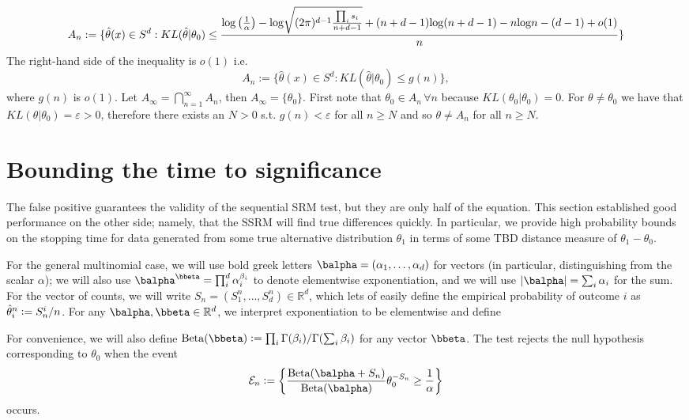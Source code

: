 \documentclass[11pt]{article}
\def\log{{\rm log}}
\newcommand{\Reals}{\mathbb R}
\newcommand{\Beta}{\mathrm{Beta}}
\newcommand{\df}{\vcentcolon=}
\begin{document}
\begin{equation}
  A_n := \lbrace \hat{\theta}(x) \in  S^d : KL(\hat{\theta}|\theta_0)  \leq \frac{\log\left(\frac{1}{\alpha}\right) - \log\sqrt{(2\pi)^{d-1}\frac{ \prod_i s_i}{n+d-1}}+ (n+d-1) \log (n+d-1) -  n \log n -(d-1)+o(1) }{n} \rbrace
\end{equation}
The right-hand side of the inequality is $o(1)$ i.e.
\begin{equation}
  A_n := \lbrace \hat{\theta}(x) \in  S^d : KL(\hat{\theta}|\theta_0)  \leq g(n) \rbrace,
\end{equation}
where $g(n)$ is $o(1)$.
Let $A_{\infty} = \bigcap_{n=1}^{\infty} A_n$, then $A_{\infty} = \lbrace \theta_0 \rbrace$. First note that $\theta_0 \in A_n \, \forall n$ because $KL(\theta_0|\theta_0) = 0$. For $\theta \neq \theta_0$ we have that $KL(\theta|\theta_0) = \varepsilon >  0$, therefore there exists an $N>0$ s.t. $g(n) < \varepsilon$ for all $n \geq N$ and so $\theta \neq A_n$ for all $n \geq N$.



\section{Bounding the time to significance}
The false positive guarantees the validity of the sequential SRM test, but they are only half of the equation. This section established good performance on the other side; namely, that the SSRM will find true differences quickly. In particular, we provide high probability bounds on the stopping time for data generated from some true alternative distribution $\theta_1$ in terms of some TBD distance measure of $\theta_1 - \theta_0$.

For the general multinomial case, we will use bold greek letters $\balpha = (\alpha_1,\ldots, \alpha_d)$ for vectors (in particular, distinguishing from the scalar $\alpha$); we will also use $\balpha^\bbeta = \prod_{i}^d \alpha_i^{\beta_i}$ to denote elementwise exponentiation, and we will use $|\balpha| = \sum_i\alpha_i$ for the sum. For the vector of counts, we will write $S_n=(S_1^n,\ldots, S_d^n)\in\Reals^d$, which lets of easily define the empirical probability of outcome $i$ as $\hat \theta_i^n \df S_n^i/n$. For any $\balpha,\bbeta\in\Reals^d$, we interpret exponentiation to be elementwise and define 

For convenience, we will also define $\Beta(\bbeta) \df \prod_i \Gamma(\beta_i) / \Gamma(\sum_i\beta_i)$ for any vector $\bbeta$. The test rejects the null hypothesis corresponding to $\theta_0$ when the event
\begin{equation}\label{eq:multinomial.rejection.region}
  \mathcal E_n \df \left\{\frac{\Beta(\balpha + S_n)}
  {\Beta(\balpha)}
  \theta_0 ^{-S_n} \geq \frac{1}{\alpha}\right\}
\end{equation}
occurs.
\end{document}
